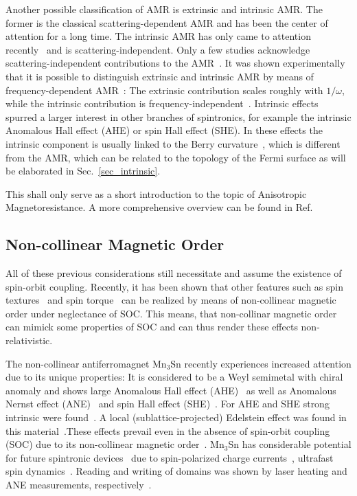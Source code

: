 \documentclass[prb,showpacs,amsmath,amssymb,superscriptaddress,twocolumn,floatfix]{revtex4-1}
\begin{document}
Another possible classification of AMR is extrinsic and intrinsic AMR. The former is the classical scattering-dependent AMR and has been the center of attention for a long time. The intrinsic AMR has only came to attention recently~\cite{Nadvordnik:2021, Park:2021} and is scattering-independent. Only a few studies acknowledge scattering-independent contributions to the AMR~\cite{Kato:2008, Velev:2005, Zeng:2020, Kato:2007}. It was shown experimentally that it is possible to distinguish extrinsic and intrinsic AMR by means of frequency-dependent AMR~\cite{Nadvordnik:2021, Park:2021}: The extrinsic contribution scales roughly with $1/\omega$, while the intrinsic contribution is frequency-independent~\cite{Nadvordnik:2021}. Intrinsic effects spurred a larger interest in other branches of spintronics, for example the intrinsic Anomalous Hall effect (AHE) or spin Hall effect (SHE). In these effects the intrinsic component is usually linked to the Berry curvature~\cite{Zhang:2017,Nagaosa:2010}, which is different from the AMR, which can be related to the topology of the Fermi surface as will be elaborated in Sec.~\ref{sec_intrinsic}.

This shall only serve as a short introduction to the topic of Anisotropic Magnetoresistance. A more comprehensive overview can be found in Ref.~\cite{Ritzinger:2023}

\subsection{Non-collinear Magnetic Order}

All of these previous considerations still necessitate and assume the existence of spin-orbit coupling. Recently, it has been shown that other features such as spin textures~\cite{Bonbien:2022} and spin torque~\cite{Gonzalez-Hernandez:2024} can be realized by means of non-collinear magnetic order under neglectance of SOC. This means, that non-collinar magnetic order can mimick some properties of SOC and can thus render these effects non-relativistic.

The non-collinear antiferromagnet Mn$_3$Sn recently experiences increased attention due to its unique properties: It is considered to be a Weyl semimetal with chiral anomaly\cite{Park:2018, Sharma:2023, Manna:2018, Wu:2023, Chen:2021, Nakatsuji:2015, Reichlova:2019} and shows large Anomalous Hall effect (AHE)~\cite{Manna:2018, Chen:2021, Zelezny:2017, Nakatsuji:2015, Zhou:2020} as well as Anomalous Nernst effect (ANE)~\cite{Manna:2018, Chen:2021, Zhou:2020, Ikhlas:2017} and spin Hall effect (SHE)~\cite{Zhou:2020, Zhang:2017}. For AHE and SHE strong intrinsic were found~\cite{Zhang:2017}. A local (sublattice-projected) Edelstein effect was found in this material~\cite{Gonzalez-Hernandez:2024}.These effects prevail even in the absence of spin-orbit coupling (SOC) due to its non-collinear magnetic order~\cite{Manna:2018, Gonzalez-Hernandez:2024}. Mn$_3$Sn has considerable potential for future spintronic devices~\cite{Manna:2018, Chen:2021, Nakatsuji:2015} due to spin-polarized charge currents~\cite{Zelezny:2017}, ultrafast spin dynamics~\cite{Chen:2021, Nakatsuji:2015}. Reading and writing of domains was shown by laser heating and ANE measurements, respectively~\cite{Reichlova:2019}.
\end{document}
